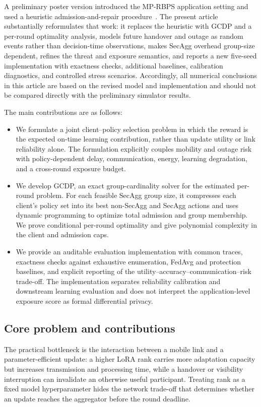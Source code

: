 \documentclass[preprint,12pt]{elsarticle}
\begin{document}
A preliminary poster version introduced the MP-RBPS application setting and used a heuristic admission-and-repair procedure~\cite{ma2026mswim}. The present article substantially reformulates that work: it replaces the heuristic with GCDP and a per-round optimality analysis, models future handover and outage as random events rather than decision-time observations, makes SecAgg overhead group-size dependent, refines the threat and exposure semantics, and reports a new five-seed implementation with exactness checks, additional baselines, calibration diagnostics, and controlled stress scenarios. Accordingly, all numerical conclusions in this article are based on the revised model and implementation and should not be compared directly with the preliminary simulator results.

The main contributions are as follows:
\begin{itemize}
	\item We formulate a joint client--policy selection problem in which the reward is the expected on-time learning contribution, rather than update utility or link reliability alone. The formulation explicitly couples mobility and outage risk with policy-dependent delay, communication, energy, learning degradation, and a cross-round exposure budget.
	
	\item We develop GCDP, an exact group-cardinality solver for the estimated per-round problem. For each feasible SecAgg group size, it compresses each client's policy set into its best non-SecAgg and SecAgg actions and uses dynamic programming to optimize total admission and group membership. We prove conditional per-round optimality and give polynomial complexity in the client and admission caps.
	
	\item We provide an auditable evaluation implementation with common traces, exactness checks against exhaustive enumeration, FedAvg and protection baselines, and explicit reporting of the utility--accuracy--communication--risk trade-off. The implementation separates reliability calibration and downstream learning evaluation and does not interpret the application-level exposure score as formal differential privacy.
\end{itemize}

\subsection{Core problem and contributions}
\label{sec:motivation_contributions}
The practical bottleneck is the interaction between a mobile link and a parameter-efficient update: a higher LoRA rank carries more adaptation capacity but increases transmission and processing time, while a handover or visibility interruption can invalidate an otherwise useful participant. Treating rank as a fixed model hyperparameter hides the network trade-off that determines whether an update reaches the aggregator before the round deadline.
\end{document}
